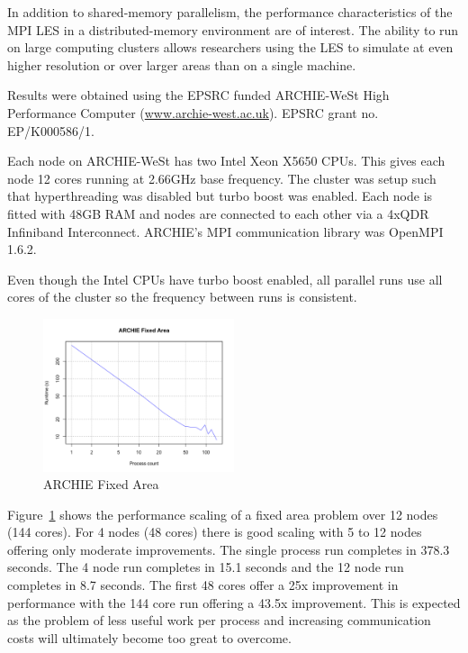 In addition to shared-memory parallelism, the performance characteristics of the
MPI LES in a distributed-memory environment are of interest. The ability to run
on large computing clusters allows researchers using the LES to simulate at even
higher resolution or over larger areas than on a single machine.

Results were obtained using the EPSRC funded ARCHIE-WeSt High Performance
Computer (\url{www.archie-west.ac.uk}). EPSRC grant no. EP/K000586/1.

Each node on ARCHIE-WeSt has two Intel Xeon X5650 CPUs. This gives each node 12
cores running at 2.66GHz base frequency. The cluster was setup such that
hyperthreading was disabled but turbo boost was enabled. Each node is fitted
with 48GB RAM and nodes are connected to each other via a 4xQDR Infiniband
Interconnect. ARCHIE's MPI communication library was OpenMPI 1.6.2.

Even though the Intel CPUs have turbo boost enabled, all parallel runs use all
cores of the cluster so the frequency between runs is consistent.

\begin{figure}
    \includegraphics[width=0.5\textwidth]{graphs/ARCHIE-fixed-area.png}
    \caption{ARCHIE Fixed Area}
    \label{fig:archiefixedarea}
\end{figure}

Figure~\ref{fig:archiefixedarea} shows the performance scaling of a fixed area
problem over 12 nodes (144 cores). For 4 nodes (48 cores) there is good scaling
with 5 to 12 nodes offering only moderate improvements. The single process run
completes in 378.3 seconds. The 4 node run completes in 15.1 seconds and the 12
node run completes in 8.7 seconds. The first 48 cores offer a 25x improvement in
performance with the 144 core run offering a 43.5x improvement. This is expected
as the problem of less useful work per process and increasing communication
costs will ultimately become too great to overcome.

